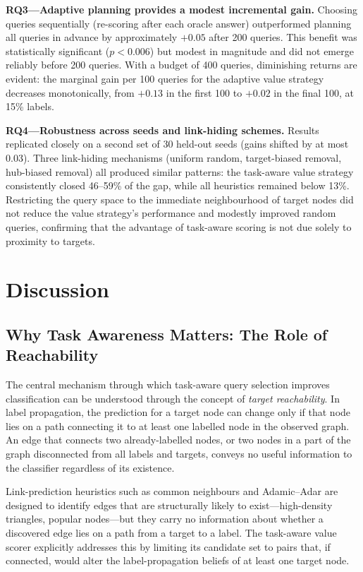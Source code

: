 \documentclass[11pt,a4paper]{article}
\begin{document}
\textbf{RQ3---Adaptive planning provides a modest incremental gain.}
Choosing queries sequentially (re-scoring after each oracle answer) outperformed planning all
queries in advance by approximately $+0.05$ after 200 queries. This benefit was statistically
significant ($p<0.006$) but modest in magnitude and did not emerge reliably before 200 queries.
With a budget of 400 queries, diminishing returns are evident: the marginal gain per 100 queries
for the adaptive value strategy decreases monotonically, from $+0.13$ in the first 100 to
$+0.02$ in the final 100, at 15\% labels.

\textbf{RQ4---Robustness across seeds and link-hiding schemes.}
Results replicated closely on a second set of 30 held-out seeds (gains shifted by at most 0.03).
Three link-hiding mechanisms (uniform random, target-biased removal, hub-biased removal) all
produced similar patterns: the task-aware value strategy consistently closed 46--59\% of the
gap, while all heuristics remained below 13\%. Restricting the query space to the immediate
neighbourhood of target nodes did not reduce the value strategy's performance and modestly
improved random queries, confirming that the advantage of task-aware scoring is not due solely
to proximity to targets.

\section{Discussion}
\label{sec:discussion}

\subsection{Why Task Awareness Matters: The Role of Reachability}

The central mechanism through which task-aware query selection improves classification can be
understood through the concept of \emph{target reachability}. In label propagation, the
prediction for a target node can change only if that node lies on a path connecting it to at
least one labelled node in the observed graph. An edge that connects two already-labelled
nodes, or two nodes in a part of the graph disconnected from all labels and targets, conveys
no useful information to the classifier regardless of its existence.

Link-prediction heuristics such as common neighbours and Adamic--Adar are designed to identify
edges that are structurally likely to exist---high-density triangles, popular nodes---but they
carry no information about whether a discovered edge lies on a path from a target to a label.
The task-aware value scorer explicitly addresses this by limiting its candidate set to pairs
that, if connected, would alter the label-propagation beliefs of at least one target node.
\end{document}
